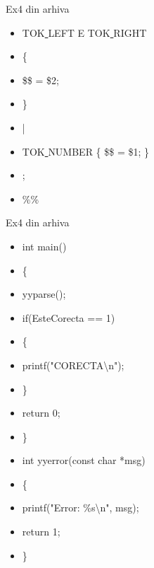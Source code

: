 \documentclass[pdf]{beamer}
\begin{document}
\begin{frame}{Ex4 din arhiva}
\begin{itemize}
\item
 TOK\underline{ }LEFT E TOK\underline{ }RIGHT
\item \hspace{6mm}
      \{
\item \hspace{6mm}    
	\$\$ = \$2;
\item \hspace{6mm}
      \}
\item \hspace{4mm}
    |
\item \hspace{4mm}
    TOK\underline{ }NUMBER \{ \$\$ = \$1; \}
\item \hspace{4mm}
    ;
\item
\%\%
\end{itemize}
\end{frame}



\begin{frame}{Ex4 din arhiva}
\begin{itemize}
\item
int main()
\item
\{
\item \hspace{4mm}
	yyparse();
\item \hspace{4mm} \vspace{5mm}
	if(EsteCorecta == 1)
\item \hspace{4mm}
	\{
\item \hspace{10mm}
		printf("CORECTA\textbackslash n");	
\item \hspace{4mm} \vspace{5mm}	
	\}	
\item \hspace{4mm}
       return 0;
\item \hspace{4mm}
\}
\item \vspace{5mm}
int yyerror(const char *msg)
\item
\{
\item \hspace{4mm}
	printf("Error: \%s\textbackslash n", msg);
\item \hspace{4mm}
	return 1;
\item
\}
\end{itemize}
\end{frame}
\end{document}
